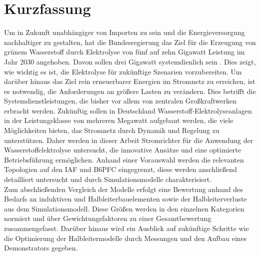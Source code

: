\chapter{Kurzfassung}
Um in Zukunft unabhängiger von Importen zu sein und die Energieversorgung nachhaltiger zu gestalten, hat die Bundesregierung das Ziel für die Erzeugung von grünem Wasserstoff durch Elektrolyse von fünf auf zehn Gigawatt Leistung im Jahr 2030 angehoben. Davon sollen drei Gigawatt systemdienlich sein \cite{BMWKH2}. Dies zeigt, wie wichtig es ist, die Elektrolyse für zukünftige Szenarien vorzubereiten.
Um darüber hinaus das Ziel rein erneuerbarer Energien im Stromnetz zu erreichen, ist es notwendig, die Anforderungen an größere Lasten zu verändern. Dies betrifft die Systemdienstleistungen, die bisher vor allem von zentralen Großkraftwerken erbracht werden. Zukünftig sollen in Deutschland Wasserstoff-Elektrolyseanlagen in der Leistungsklasse von mehreren Megawatt aufgebaut werden, die viele Möglichkeiten bieten, das Stromnetz durch Dynamik und Regelung zu unterstützen. Daher werden in dieser Arbeit Stromrichter für die Anwendung der Wasserstoffelektrolyse untersucht, die innovative Ansätze und eine optimierte Betriebsführung ermöglichen. Anhand einer Vorauswahl werden die relevanten Topologien auf den \gls{IAF} und \gls{B6PFC} eingegrenzt, diese werden anschließend detailliert untersucht und durch Simulationsmodelle charakterisiert.\\
Zum abschließenden Vergleich der Modelle erfolgt eine Bewertung anhand des Bedarfs an induktiven und Halbleiterbauelementen sowie der Halbleiterverluste aus dem Simulationsmodell. Diese Größen werden in den einzelnen Kategorien normiert und über Gewichtungsfaktoren zu einer Gesamtbewertung zusammengefasst. Darüber hinaus wird ein Ausblick auf zukünftige Schritte wie die Optimierung der Halbleitermodelle durch Messungen und den Aufbau eines Demonstrators gegeben.
